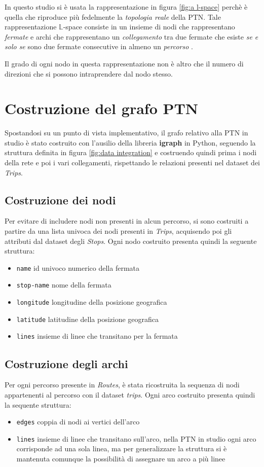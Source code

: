 In questo studio si è usata la rappresentazione in figura \ref{fig:a l-space} perchè è quella che riproduce più fedelmente la \textit{topologia reale} della PTN. Tale rappresentazione $\mathbb{L}$-space consiste in un insieme di nodi che rappresentano \textit{fermate} e archi che rappresentano un \textit{collegamento} tra due fermate che esiste \textit{se e solo se} sono due fermate consecutive in almeno un \textit{percorso} \cite{vonFerber2012LondonParis}.

Il grado di ogni nodo in questa rappresentazione non è altro che il numero di direzioni \cite{SienkiewiczHolyst2005} che si possono intraprendere dal nodo stesso.

\section{Costruzione del grafo PTN}
Spostandosi su un punto di vista implementativo, il grafo relativo alla PTN in studio è stato costruito con l'ausilio della libreria \textbf{igraph} \cite{igraph} in Python, seguendo la struttura definita in figura \ref{fig:data integration} e costruendo quindi prima i nodi della rete e poi i vari collegamenti, rispettando le relazioni presenti nel dataset dei \textit{Trips}.

\subsection{Costruzione dei nodi}
Per evitare di includere nodi non presenti in alcun percorso, si sono costruiti a partire da una lista univoca dei nodi presenti in \textit{Trips}, acquisendo poi gli attributi dal dataset degli \textit{Stops}. Ogni nodo costruito presenta quindi la seguente struttura:
\begin{itemize}
    \item \texttt{name} id univoco numerico della fermata
    \item \texttt{stop-name} nome della fermata
    \item \texttt{longitude} longitudine della posizione geografica
    \item \texttt{latitude} latitudine della posizione geografica
    \item \texttt{lines} insieme di linee che transitano per la fermata
\end{itemize}

\subsection{Costruzione degli archi}
Per ogni percorso presente in \textit{Routes}, è stata ricostruita la sequenza di nodi appartenenti al percorso con il dataset \textit{trips}. Ogni arco costruito presenta quindi la sequente struttura:
\begin{itemize}
    \item \texttt{edges} coppia di nodi ai vertici dell'arco
    \item \texttt{lines} insieme di linee che transitano sull'arco, nella PTN in studio ogni arco corrisponde ad una sola linea, ma per generalizzare la struttura si è mantenuta comunque la possibilità di assegnare un arco a più linee
\end{itemize}

